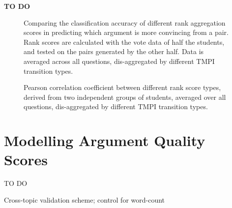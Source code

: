 \documentclass[notitlepage,12pt]{jedm}
\begin{document}
\textbf{TO DO}



\begin{figure}
	\scalebox{0.6}{}
	\caption{
		Comparing the classification accuracy of different rank aggregation 
		scores in predicting which argument is more convincing from a pair. 
		Rank scores are calculated with the vote data of half the students, and 
		tested on the pairs generated by the other half. 
		Data is averaged across all questions, dis-aggregated by different TMPI 
		transition types. 
	}
	\label{fig:acc_by_rank_score_type}
\end{figure}

\begin{figure}
	\scalebox{0.6}{}
	\caption{
		Pearson correlation coefficient between different rank score types, 
		derived from two independent groups of students, averaged over all 
		questions, dis-aggregated by different TMPI transition types.
	}
	\label{fig:acc_by_rank_score_type}
\end{figure}






\section{Modelling Argument Quality Scores}\label{sec:model}

TO DO

Cross-topic validation scheme; control for word-count
\end{document}
